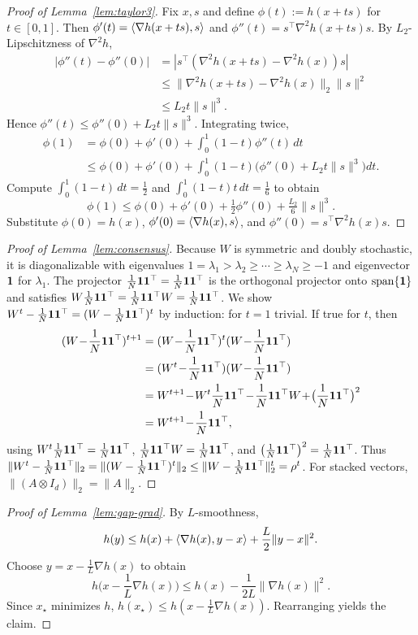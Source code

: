 \documentclass[review,onefignum,onetabnum]{siamart171218}
\begin{document}
	\begin{proof}[Proof of Lemma~\ref{lem:taylor3}]
		Fix $x,s$ and define $\phi(t):=h(x+ts)$ for $t\in[0,1]$.
		Then $\phi'(t)=\left\langle \nabla h(x+ts),s\right\rangle$ and $\phi''(t)=s^\top\nabla^2 h(x+ts)s$.
		By $L_2$-Lipschitzness of $\nabla^2 h$,
		\begin{align*}
			|\phi''(t)\!-\!\phi''(0)|
			&=|s^\top(\nabla^2 h(x\!+\!ts)\!-\!\nabla^2 h(x))s|\\
			&\le \|\nabla^2 h(x\!+\!ts)\!-\!\nabla^2 h(x)\|_2\|s\|^2\\
			&\le L_2 t\|s\|^3.
		\end{align*}
		Hence $\phi''(t)\le \phi''(0)+L_2 t\|s\|^3$.
		Integrating twice,
		\begin{align*}
			\phi(1)&=\phi(0)+\phi'(0)+\int_0^1\!(1\!-\!t)\phi''(t)\,dt\\
			&\le \phi(0)+\phi'(0)+\!\int_0^1\!(1\!-\!t)\big(\phi''(0)+L_2 t\|s\|^3\big)dt.
		\end{align*}
		Compute $\int_0^1(1-t)\,dt=\tfrac12$ and $\int_0^1(1-t)t\,dt=\tfrac16$ to obtain
		\[
		\phi(1)\le \phi(0)+\phi'(0)+\tfrac12\phi''(0)+\tfrac{L_2}{6}\|s\|^3.
		\]
		Substitute $\phi(0)=h(x)$, $\phi'(0)=\left\langle \nabla h(x),s\right\rangle$, and $\phi''(0)=s^\top\nabla^2 h(x)s$.
	\end{proof}
	
	\begin{proof}[Proof of Lemma~\ref{lem:consensus}]
		Because $W$ is symmetric and doubly stochastic, it is diagonalizable with eigenvalues
		$1=\lambda_1>\lambda_2\ge\cdots\ge\lambda_N\ge -1$ and eigenvector $\mathbf{1}$ for $\lambda_1$.
		The projector $\frac{1}{N}\mathbf{1}\mathbf{1}^\top=\frac1N\mathbf{1}\mathbf{1}^\top$ is the orthogonal projector onto $\mathrm{span}\{\mathbf{1}\}$ and satisfies $W\frac{1}{N}\mathbf{1}\mathbf{1}^\top=\frac{1}{N}\mathbf{1}\mathbf{1}^\top W=\frac{1}{N}\mathbf{1}\mathbf{1}^\top$.
		We show $W^t-\frac{1}{N}\mathbf{1}\mathbf{1}^\top=(W-\frac{1}{N}\mathbf{1}\mathbf{1}^\top)^t$ by induction: for $t=1$ trivial. If true for $t$, then
		\begin{align*}
			(W\!-\!\J)^{t+1}&=(W\!-\!\J)^t(W\!-\!\J)\\
			&=(W^t\!-\!\J)(W\!-\!\J)\\
			&=W^{t+1}\!-\!W^t\J\!-\!\J W\!+\!\Jpar^2\\
			&=W^{t+1}\!-\!\J,
		\end{align*}
		using $W^t\frac{1}{N}\mathbf{1}\mathbf{1}^\top=\frac{1}{N}\mathbf{1}\mathbf{1}^\top$, $\frac{1}{N}\mathbf{1}\mathbf{1}^\top W=\frac{1}{N}\mathbf{1}\mathbf{1}^\top$, and $\bigl(\frac{1}{N}\mathbf{1}\mathbf{1}^\top\bigr)^2=\frac{1}{N}\mathbf{1}\mathbf{1}^\top$.
		Thus $\|W^t-\frac{1}{N}\mathbf{1}\mathbf{1}^\top\|_2=\|(W-\frac{1}{N}\mathbf{1}\mathbf{1}^\top)^t\|_2\le \|W-\frac{1}{N}\mathbf{1}\mathbf{1}^\top\|_2^t=\rho^t$.
		For stacked vectors, $\|(A\otimes I_d)\|_2=\|A\|_2$.
	\end{proof}
	
	\begin{proof}[Proof of Lemma~\ref{lem:gap-grad}]
		By $L$-smoothness,
		\[
		h(y)\le h(x)+\left\langle \nabla h(x),y-x\right\rangle+\frac{L}{2}\|y-x\|^2.
		\]
		Choose $y=x-\frac1L\nabla h(x)$ to obtain
		\[
		h\Big(x-\frac1L\nabla h(x)\Big)\le h(x)-\frac{1}{2L}\|\nabla h(x)\|^2.
		\]
		Since $x_\star$ minimizes $h$, $h(x_\star)\le h(x-\frac1L\nabla h(x))$. Rearranging yields the claim.
	\end{proof}
	
\end{document}
